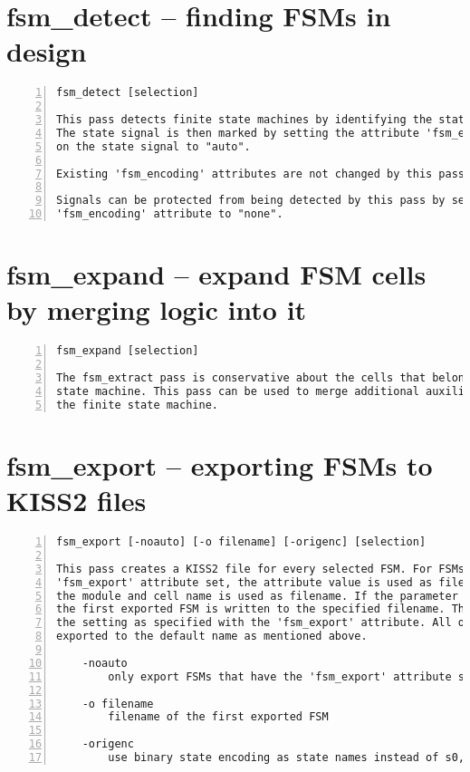 \section{fsm\_detect -- finding FSMs in design}
\label{cmd:fsm_detect}
\begin{lstlisting}[numbers=left,frame=single]
    fsm_detect [selection]

This pass detects finite state machines by identifying the state signal.
The state signal is then marked by setting the attribute 'fsm_encoding'
on the state signal to "auto".

Existing 'fsm_encoding' attributes are not changed by this pass.

Signals can be protected from being detected by this pass by setting the
'fsm_encoding' attribute to "none".
\end{lstlisting}

\section{fsm\_expand -- expand FSM cells by merging logic into it}
\label{cmd:fsm_expand}
\begin{lstlisting}[numbers=left,frame=single]
    fsm_expand [selection]

The fsm_extract pass is conservative about the cells that belong to a finite
state machine. This pass can be used to merge additional auxiliary gates into
the finite state machine.
\end{lstlisting}

\section{fsm\_export -- exporting FSMs to KISS2 files}
\label{cmd:fsm_export}
\begin{lstlisting}[numbers=left,frame=single]
    fsm_export [-noauto] [-o filename] [-origenc] [selection]

This pass creates a KISS2 file for every selected FSM. For FSMs with the
'fsm_export' attribute set, the attribute value is used as filename, otherwise
the module and cell name is used as filename. If the parameter '-o' is given,
the first exported FSM is written to the specified filename. This overwrites
the setting as specified with the 'fsm_export' attribute. All other FSMs are
exported to the default name as mentioned above.

    -noauto
        only export FSMs that have the 'fsm_export' attribute set

    -o filename
        filename of the first exported FSM

    -origenc
        use binary state encoding as state names instead of s0, s1, ...
\end{lstlisting}


